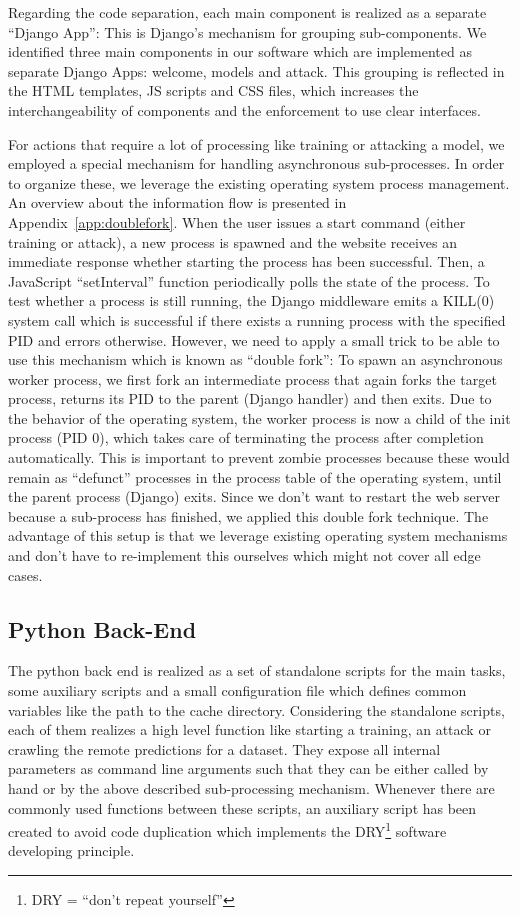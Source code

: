 Regarding the code separation, each main component is realized as a separate \enquote{Django App}: This is Django's mechanism for grouping sub-components.
We identified three main components in our software which are implemented as separate Django Apps: welcome, models and attack.
This grouping is reflected in the HTML templates, JS scripts and CSS files, which increases the interchangeability of components and the enforcement to use clear interfaces.

For actions that require a lot of processing like training or attacking a model, we employed a special mechanism for handling asynchronous sub-processes.
In order to organize these, we leverage the existing operating system process management.
An overview about the information flow is presented in Appendix~\ref{app:doublefork}.
When the user issues a start command (either training or attack), a new process is spawned and the website receives an immediate response whether starting the process has been successful.
Then, a JavaScript \enquote{setInterval} function periodically polls the state of the process.
To test whether a process is still running, the Django middleware emits a KILL(0) system call which is successful if there exists a running process with the specified PID and errors otherwise.
However, we need to apply a small trick to be able to use this mechanism which is known as \enquote{double fork}: To spawn an asynchronous worker process, we first fork an intermediate process that again forks the target process, returns its PID to the parent (Django handler) and then exits.
Due to the behavior of the operating system, the worker process is now a child of the init process (PID 0), which takes care of terminating the process after completion automatically.
This is important to prevent zombie processes because these would remain as \enquote{defunct} processes in the process table of the operating system, until the parent process (Django) exits.
Since we don't want to restart the web server because a sub-process has finished, we applied this double fork technique.
The advantage of this setup is that we leverage existing operating system mechanisms and don't have to re-implement this ourselves which might not cover all edge cases.


\subsection{Python Back-End}\label{subsec:backend}
The python back end is realized as a set of standalone scripts for the main tasks, some auxiliary scripts and a small configuration file which defines common variables like the path to the cache directory.
Considering the standalone scripts, each of them realizes a high level function like starting a training, an attack or crawling the remote predictions for a dataset.
They expose all internal parameters as command line arguments such that they can be either called by hand or by the above described sub-processing mechanism.
Whenever there are commonly used functions between these scripts, an auxiliary script has been created to avoid code duplication which implements the DRY\footnote{DRY = \enquote{don't repeat yourself}} software developing principle.


